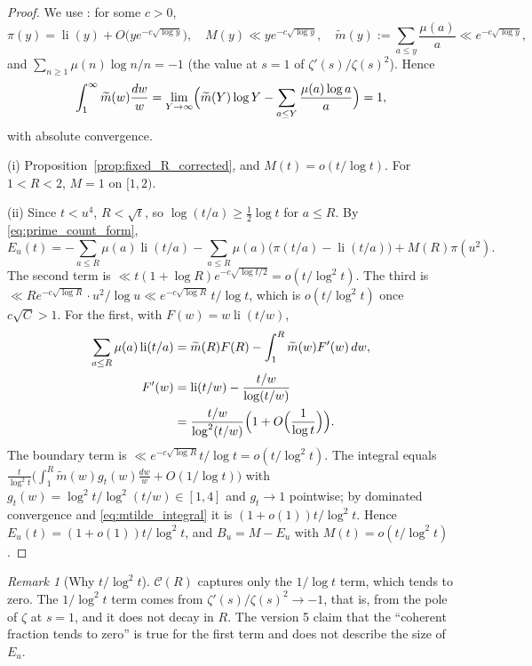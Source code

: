 \documentclass[11pt]{amsart}
\numberwithin{equation}{section}
\theoremstyle{plain}
\theoremstyle{definition}
\theoremstyle{remark}
\newtheorem{remark}[theorem]{Remark}
\DeclareMathOperator{\li}{li}
\newcommand{\Cc}{\mathcal{C}}
\newcommand{\mt}{\widetilde{m}}
\begin{document}
\begin{proof}
We use \cite{MontgomeryVaughan2007}: for some $c>0$,
\begin{equation}
\label{eq:pnt_inputs}
  \pi(y)=\li(y)+O\bigl(ye^{-c\sqrt{\log y}}\bigr),\quad
  M(y)\ll ye^{-c\sqrt{\log y}},\quad
  \mt(y):=\sum_{a\le y}\frac{\mu(a)}a\ll e^{-c\sqrt{\log y}},
\end{equation}
and $\sum_{n\ge1}\mu(n)\log n/n=-1$ (the value at $s=1$ of
$\zeta'(s)/\zeta(s)^2$). Hence
\begin{equation}
\label{eq:mtilde_integral}
  \int_1^\infty\mt(w)\frac{dw}w
  =\lim_{Y\to\infty}\Bigl(\mt(Y)\log Y-\sum_{a\le Y}\frac{\mu(a)\log a}a\Bigr)=1,
\end{equation}
with absolute convergence.

(i) Proposition~\ref{prop:fixed_R_corrected}, and $M(t)=o(t/\log t)$. For
$1<R<2$, $M=1$ on $[1,2)$.

(ii) Since $t<u^4$, $R<\sqrt t$, so $\log(t/a)\ge\frac12\log t$ for
$a\le R$. By \eqref{eq:prime_count_form},
\begin{equation}
\label{eq:E_three_terms}
  E_u(t)=-\sum_{a\le R}\mu(a)\li(t/a)
  -\sum_{a\le R}\mu(a)\bigl(\pi(t/a)-\li(t/a)\bigr)+M(R)\pi(u^2).
\end{equation}
The second term is $\ll t(1+\log R)e^{-c\sqrt{\log t/2}}=o(t/\log^2t)$. The
third is $\ll Re^{-c\sqrt{\log R}}\cdot u^2/\log u\ll e^{-c\sqrt{\log R}}\,
t/\log t$, which is $o(t/\log^2t)$ once $c\sqrt C>1$. For the first, with
$F(w)=w\li(t/w)$,
\begin{align}
\label{eq:partial_summation_li}
  \sum_{a\le R}\mu(a)\li(t/a)
  &=\mt(R)F(R)-\int_1^R\mt(w)F'(w)\,dw,\\
  F'(w)
  &=\li(t/w)-\frac{t/w}{\log(t/w)}\notag\\
  &=\frac{t/w}{\log^2(t/w)}
    \Bigl(1+O\Bigl(\frac1{\log t}\Bigr)\Bigr).\notag
\end{align}
The boundary term is $\ll e^{-c\sqrt{\log R}}t/\log t=o(t/\log^2t)$. The
integral equals
$\frac t{\log^2t}\bigl(\int_1^R\mt(w)g_t(w)\frac{dw}w+O(1/\log t)\bigr)$ with
$g_t(w)=\log^2t/\log^2(t/w)\in[1,4]$ and $g_t\to1$ pointwise; by dominated
convergence and \eqref{eq:mtilde_integral} it is $(1+o(1))t/\log^2t$. Hence
$E_u(t)=(1+o(1))t/\log^2t$, and $B_u=M-E_u$ with $M(t)=o(t/\log^2t)$.
\end{proof}

\begin{remark}[Why $t/\log^2t$]
\label{rem:why_log2}
$\Cc(R)$ captures only the $1/\log t$ term, which tends to zero. The
$1/\log^2t$ term comes from $\zeta'(s)/\zeta(s)^2\to-1$, that is, from the
pole of $\zeta$ at $s=1$, and it does not decay in $R$. The version 5 claim
that the ``coherent fraction tends to zero'' is true for the first term and
does not describe the size of $E_u$.
\end{remark}
\end{document}
